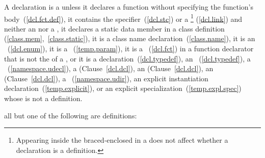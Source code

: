 \pnum
{}%
%
A declaration is a  unless it declares a function
without specifying the function's body~(\ref{dcl.fct.def}), it contains
the
%
 specifier~(\ref{dcl.stc}) or a
\footnote{Appearing inside the braced-enclosed
 in a  does
not affect whether a declaration is a definition.}
(\ref{dcl.link}) and neither an  nor a
,
%
it declares a static data member in a class
definition (\ref{class.mem},~\ref{class.static}),
%
it is a class name declaration~(\ref{class.name}),
it is an
%
~(\ref{dcl.enum}),
it is a
%
~(\ref{temp.param}),
it is a
%
~(\ref{dcl.fct}) in a function
%
declarator that is not the  of a
,
or it is a
%
 declaration~(\ref{dcl.typedef}),
an ~(\ref{dcl.typedef}),
a
~(\ref{namespace.udecl}),
a  (Clause~\ref{dcl.dcl}), an
 (Clause~\ref{dcl.dcl}), an
 (Clause~\ref{dcl.dcl}),
a ~(\ref{namespace.udir}),
an explicit instantiation declaration~(\ref{temp.explicit}), or
an explicit specialization~(\ref{temp.expl.spec}) whose
 is not a definition.

\enterexample all but one of the following are definitions:


